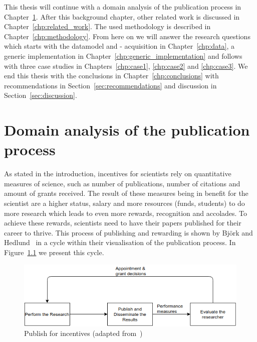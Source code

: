 \documentclass{ou-report}
\newcommand{\outline}[1]{{\color{blue} #1}}
\begin{document}
This thesis will continue with a domain analysis of the publication process in
Chapter~\ref{chp:domainanalysis}. After this background chapter, other 
related work is discussed in Chapter~\ref{chp:related_work}. The used
methodology is described in Chapter~\ref{chp:methodology}. 
From here on we will
answer the research questions which starts with the datamodel and - acquisition
in Chapter~\ref{chp:data}, a generic implementation in 
Chapter~\ref{chp:generic_implementation} and follows with three case studies in 
Chapters~\ref{chp:case1}, \ref{chp:case2} and \ref{chp:case3}. 
We end this thesis with the conclusions in Chapter~\ref{chp:conclusions} with
recommendations in Section~\ref{sec:recommendations} and discussion in
Section~\ref{sec:discussion}.




\chapter{Domain analysis of the publication process}
\label{chp:domainanalysis}

As stated in the introduction, incentives for scientists rely on quantitative 
measures of science, such as 
number of publications, number of citations and amount of grants received. The
result of these measures being in benefit for the scientist are a higher status, 
salary and more resources (funds, students) to do 
more research which leads to even more rewards, recognition and accolades. To 
achieve these rewards, scientists need to have their papers published for their 
career to thrive. This process of publishing and rewarding is shown by Bj\"ork 
and Hedlund~\cite{BH2004} in a cycle within their visualisation of the 
publication process. In Figure~\ref{fig:publish_incentives} we present this 
cycle.

\begin{figure}[H]
\centering
\includegraphics[width=12cm]{images/publication_process.drawio.png}
\caption{Publish for incentives (adapted from~\cite{BH2004})}
\label{fig:publish_incentives}
\end{figure}
\end{document}
